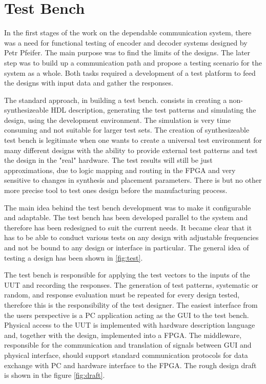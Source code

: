 \chapter{Test Bench}\label{ch:Test_Bench}
In the first stages of the work on the dependable communication system, there was a need for functional testing of encoder and decoder systems designed by Petr Pfeifer. The main purpose was to find the limits of the designs. The later step was to build up a communication path and propose a testing scenario for the system as a whole. Both tasks required a development of a test platform to feed the designs with input data and gather the responses.

The standard approach, in building a test bench. consists in creating a non-synthesizeable HDL description, generating the test patterns and simulating the design, using the development environment. The simulation is very time consuming and not suitable for larger test sets. The creation of synthesizeable test bench is legitimate when one wants to create a universal test environment for many different designs with the ability to provide external test patterns and test the design in the "real" hardware. The test results will still be just approximations, due to logic mapping and routing in the FPGA and very sensitive to changes in synthesis and placement parameters. There is but no other more precise tool to test ones design before the manufacturing process.

The main idea behind the test bench development was to make it configurable and adaptable. The test bench has been developed parallel to the system and therefore has been redesigned to suit the current needs. It became clear that it has to be able to conduct various tests on any design with adjustable frequencies and not be bound to any design or interface in particular. The general idea of testing a design has been shown in \autoref{fig:test}.

The test bench is responsible for applying the test vectors to the inputs of the UUT and recording the responses. The generation of test patterns, systematic or random, and response evaluation must be repeated for every design tested, therefore this is the responsibility of the test designer. The easiest interface from the users perspective is a PC application acting as the GUI to the test bench. Physical access to the UUT is implemented with hardware description language and, together with the design, implemented into a FPGA. The middleware, responsible for the communication and translation of signals between GUI and physical interface, should support standard communication protocols for data exchange with PC and hardware interface to the FPGA. The rough design draft is shown in the figure \autoref{fig:draft}.\\
 

